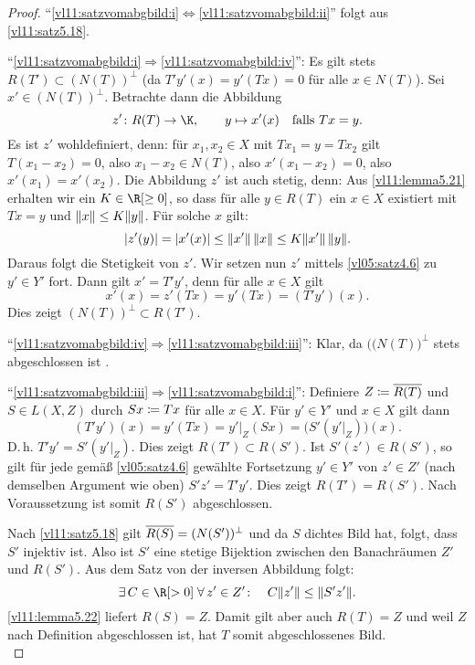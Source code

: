 \begin{proof}
    \enquote{\ref{vl11:satzvomabgbild:i}$
    \Leftrightarrow$\ref{vl11:satzvomabgbild:ii}}
    folgt aus \cref{vl11:satz5.18}.
    
    \enquote{\ref{vl11:satzvomabgbild:i}$
    \Rightarrow$\ref{vl11:satzvomabgbild:iv}}:
    Es gilt stets $R(T')\subset (N(T))^\perp$ (da $T'y'(x) = y'(Tx) = 0$ für
    alle $x\in N(T)$). Sei $x'\in (N(T))^\perp$. Betrachte dann die Abbildung
    \[ z'\colon R(T) \to \K, \qquad y\mapsto x'(x) \quad\text{falls $Tx=y$} . \]
    Es ist $z'$ wohldefiniert, denn: für $x_1,x_2\in X$ mit $Tx_1=y=Tx_2$ gilt
    $T(x_1-x_2) = 0$, also $x_1-x_2\in N(T)$, also $x'(x_1-x_2)=0$, also
    $x'(x_1)=x'(x_2)$. Die Abbildung $z'$ ist auch stetig, denn: Aus
    \cref{vl11:lemma5.21} erhalten wir ein $K\in\R[\geq0]$, so dass für alle
    $y\in R(T)$ ein $x\in X$ existiert mit $Tx=y$ und $\lVert x\rVert\leq K\lVert y\rVert$.
    Für solche $x$ gilt:
    \[ \lvert z'(y)\rvert = \lvert x'(x)\rvert \leq \lVert x'\rVert \, \lVert x\rVert \leq K\lVert x'\rVert \,
        \lVert y\rVert
    . \]
    Daraus folgt die Stetigkeit von $z'$. Wir setzen nun $z'$ mittels
    \cref{vl05:satz4.6} zu $y'\in Y'$ fort. Dann gilt $x'=T'y'$, denn
    für alle $x\in X$ gilt
    \[ x'(x) = z'(Tx) = y'(Tx) = (T'y')(x)  . \]
    Dies zeigt $(N(T))^\perp \subset R(T')$.
    
    \enquote{\ref{vl11:satzvomabgbild:iv}$
    \Rightarrow$\ref{vl11:satzvomabgbild:iii}}: 
    Klar, da $\bigl((N(T)\bigr)^\perp$ stets abgeschlossen ist
    .
    
    \enquote{\ref{vl11:satzvomabgbild:iii}$
    \Rightarrow$\ref{vl11:satzvomabgbild:i}}: 
    Definiere $Z \coloneqq \overline{R(T)}$ und $S\in L(X,Z)$ durch 
    $Sx\coloneqq Tx$ für alle $x\in X$. Für $y'\in Y'$ und $x\in X$ gilt dann
    \[ (T'y')(x) = y'(Tx) = y'\vert_Z (Sx) = \bigl( S'(y'\vert_Z) \bigr)(x) . \]
    D.\,h. $T'y' = S'(y'\vert_Z)$. Dies zeigt $R(T')\subset R(S')$. Ist
    $S'(z')\in R(S')$, so gilt für jede gemäß \cref{vl05:satz4.6} gewählte
    Fortsetzung $y'\in Y'$ von $z'\in Z'$ (nach demselben Argument wie oben) 
    $S'z'=T'y'$. Dies zeigt $R(T') = R(S')$. Nach Voraussetzung ist somit 
    $R(S')$ abgeschlossen. 
    
    Nach \cref{vl11:satz5.18} gilt $\overline{R(S)} = (N(S'))^\perp$ und
    da $S$ dichtes Bild hat, folgt, dass $S'$ injektiv ist.
    Also ist $S'$ eine stetige Bijektion zwischen den Banachräumen $Z'$ und
    $R(S')$. Aus dem Satz von der inversen Abbildung
     folgt:
    \[ \exists\, C\in\R[>0]\;\forall\,z'\in Z' \colon\quad
        C \norm{z'} \leq \norm{S'z'} 
    . \]
    \cref{vl11:lemma5.22} liefert $R(S)=Z$. Damit gilt aber auch $R(T)=Z$ 
    und weil $Z$ nach Definition abgeschlossen ist, hat $T$ somit
    abgeschlossenes Bild.
    \\
\end{proof}
